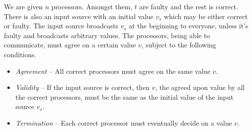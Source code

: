 \begin{definition}
We are given $n$ processors. Amongst them, $t$ are faulty and the rest is correct. There is also an input source with an initial value $v_s$ which may be either correct or faulty. The input source broadcasts $v_s$ at the beginning to everyone, unless it's faulty and broadcasts arbitrary values. The processors, being able to communicate, must agree on a certain value $v$, subject to the following conditions.
\begin{itemize}
    \item \emph{Agreement} -- All correct processors must agree on the same value $v$.
    \item \emph{Validity} -- If the input source is correct, then $v$, the agreed upon value by all the correct processors, must be the same as the initial value of the input source $v_s$.
    \item \emph{Termination} -- Each correct processor must eventually decide on a value $v$.
\end{itemize}
\end{definition}